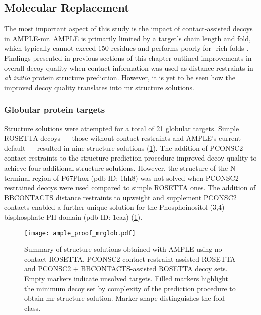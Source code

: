 \subsection{Molecular Replacement}
The most important aspect of this study is the impact of contact-assisted decoys in AMPLE-\gls{mr}. AMPLE is primarily limited by a target's chain length and fold, which typically cannot exceed 150 residues and performs poorly for \textbeta-rich folds \cite{Bibby2012-lm}. Findings presented in previous sections of this chapter outlined improvements in overall decoy quality when contact information was used as distance restraints in \textit{ab initio} protein structure prediction. However, it is yet to be seen how the improved decoy quality translates into \gls{mr} structure solutions.

\subsubsection{Globular protein targets}
Structure solutions were attempted for a total of 21 globular targets. Simple ROSETTA decoys --- those without contact restraints and AMPLE's current default --- resulted in nine structure solutions (\cref{fig:ample_proof_mrglob}). The addition of PCONSC2 contact-restraints to the structure prediction procedure improved decoy quality to achieve four additional structure solutions. However, the structure of the N-terminal region of P67Phox (\gls{pdb} ID: 1hh8) was not solved when PCONSC2-restrained decoys were used compared to simple ROSETTA ones. The addition of BBCONTACTS distance restraints to upweight and supplement PCONSC2 contacts enabled a further unique solution for the Phosphoinositol (3,4)-bisphosphate PH domain (\gls{pdb} ID: 1eaz) (\cref{fig:ample_proof_mrglob}).

\begin{figure}[H]
    \centering
    \texttt{[image: ample\_proof\_mrglob.pdf]}
    \caption[Structure solution summary for globular targets]{Summary of structure solutions obtained with AMPLE using no-contact ROSETTA, PCONSC2-contact-restraint-assisted ROSETTA and PCONSC2 + BBCONTACTS-assisted ROSETTA decoy sets. Empty markers indicate unsolved targets. Filled markers highlight the minimum decoy set by complexity of the prediction procedure to obtain \gls{mr} structure solution. Marker shape distinguishes the fold class.}
    \label{fig:ample_proof_mrglob}
\end{figure}

